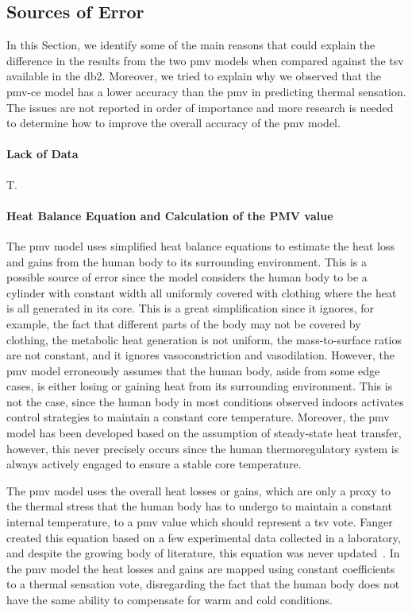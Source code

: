 \subsection{Sources of Error}\label{subsec:sources-of-error}
In this Section, we identify some of the main reasons that could explain the difference in the results from the two \ac{pmv} models when compared against the \ac{tsv} available in the \ac{db2}.
Moreover, we tried to explain why we observed that the \ac{pmv-ce} model has a lower accuracy than the \ac{pmv} in predicting thermal sensation.
The issues are not reported in order of importance and more research is needed to determine how to improve the overall accuracy of the \ac{pmv} model.

\paragraph{Lack of Data}
T.

\paragraph{Heat Balance Equation and Calculation of the PMV value}
The \ac{pmv} model uses simplified heat balance equations to estimate the heat loss and gains from the human body to its surrounding environment.
This is a possible source of error since the model considers the human body to be a cylinder with constant width all uniformly covered with clothing where the heat is all generated in its core.
This is a great simplification since it ignores, for example, the fact that different parts of the body may not be covered by clothing, the metabolic heat generation is not uniform, the mass-to-surface ratios are not constant, and it ignores vasoconstriction and vasodilation.
However, the \ac{pmv} model erroneously assumes that the human body, aside from some edge cases, is either losing or gaining heat from its surrounding environment.
This is not the case, since the human body in most conditions observed indoors activates control strategies to maintain a constant core temperature.
Moreover, the \ac{pmv} model has been developed based on the assumption of steady-state heat transfer, however, this never precisely occurs since the human thermoregulatory system is always actively engaged to ensure a stable core temperature.

The \ac{pmv} model uses the overall heat losses or gains, which are only a proxy to the thermal stress that the human body has to undergo to maintain a constant internal temperature, to a \ac{pmv} value which should represent a \ac{tsv} vote.
Fanger created this equation based on a few experimental data collected in a laboratory, and despite the growing body of literature, this equation was never updated~\cite{Fanger1970}.
In the \ac{pmv} model the heat losses and gains are mapped using constant coefficients to a thermal sensation vote, disregarding the fact that the human body does not have the same ability to compensate for warm and cold conditions.

